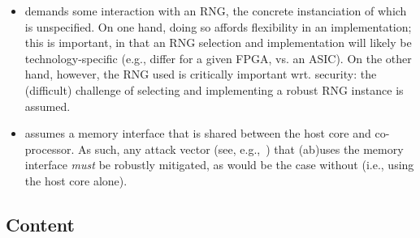 \documentclass{article}
\begin{document}
\begin{itemize}

\item \ISE demands some interaction with an RNG, the concrete instanciation 
      of which is unspecified.
      On one hand, doing so affords flexibility in an implementation; this 
      is important, in that an RNG selection and implementation will likely 
      be technology-specific (e.g., differ for a given FPGA, vs. an ASIC).  
      On the other hand, however, the RNG used is critically important wrt. 
      security: the (difficult) challenge of selecting and implementing 
      a robust RNG instance is assumed.

\item \ISE assumes a memory interface that is shared between the host core 
      and co-processor.  As such, any attack vector
      (see, e.g.,~\cite{SCARV:GYCH:18})
      that (ab)uses the memory interface {\em must} be robustly mitigated, 
      as would be the case without \ISE (i.e., using the host core alone).

\end{itemize}


\subsection*{Content}
\end{document}
